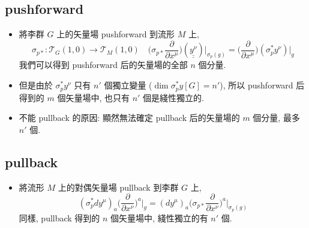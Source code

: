 \subsection{pushforward}
\begin{itemize}
	\item 將李群 $G$ 上的矢量場 pushforward 到流形 $M$ 上,
	\begin{equation}
		\sigma_{p *} : \mathcal{T}_G(1,0) \rightarrow \mathcal{T}_M(1,0) \quad \Big( \sigma_{p *} \frac{\partial}{\partial x^\mu} \Big)(\underline{\underline{y^\nu}}) \Big|_{\sigma_p(g)} = \Big( \frac{\partial}{\partial x^\mu} \Big)(\sigma^*_p y^\nu) \Big|_g
	\end{equation}
	我們可以得到 pushforward 后的矢量場的全部 $n$ 個分量.
	
	\item 但是由於 $\sigma^*_p y^\nu$ 只有 $n'$ 個獨立變量 ($\dim \sigma^*_p y [G] = n'$), 所以 pushforward 后得到的 $m$ 個矢量場中, 也只有 $n'$ 個是綫性獨立的.
	
	\item 不能 pullback 的原因: 顯然無法確定 pullback 后的矢量場的 $m$ 個分量, 最多 $n'$ 個.
\end{itemize}

\subsection{pullback}
\begin{itemize}
	\item 將流形 $M$ 上的對偶矢量場 pullback 到李群 $G$ 上,
	\begin{equation}
		(\sigma^*_p dy^\mu)_a \Big( \frac{\partial}{\partial x^\nu} \Big)^a \Big|_g = (dy^\mu)_a \Big( \sigma_{p *} \frac{\partial}{\partial x^\nu} \Big)^a \Big|_{\sigma_p(g)}
	\end{equation}
	同樣, pullback 得到的 $n$ 個矢量場中, 綫性獨立的有 $n'$ 個.
\end{itemize}

